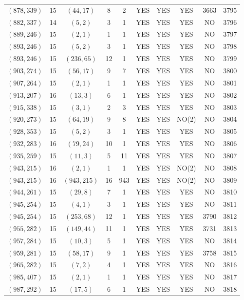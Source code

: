 \begin{longtable}{|c|c|c|c|c|c|c|c|c|c|}
$(878, 339)$ & 15 & $(44, 17)$ & 8 & 2 & YES & YES & YES & 3663 & 3795\\
$(882, 337)$ & 14 & $(5, 2)$ & 3 & 1 & YES & YES & YES & NO & 3796\\
$(889, 246)$ & 15 & $(2, 1)$ & 1 & 1 & YES & YES & YES & NO & 3797\\
$(893, 246)$ & 15 & $(5, 2)$ & 3 & 1 & YES & YES & YES & NO & 3798\\
$(893, 246)$ & 15 & $(236, 65)$ & 12 & 1 & YES & YES & YES & NO & 3799\\
$(903, 274)$ & 15 & $(56, 17)$ & 9 & 7 & YES & YES & YES & NO & 3800\\
$(907, 264)$ & 15 & $(2, 1)$ & 1 & 1 & YES & YES & YES & NO & 3801\\
$(913, 207)$ & 16 & $(13, 3)$ & 6 & 1 & YES & YES & YES & NO & 3802\\
$(915, 338)$ & 15 & $(3, 1)$ & 2 & 3 & YES & YES & YES & NO & 3803\\
$(920, 273)$ & 15 & $(64, 19)$ & 9 & 8 & YES & YES & NO(2) & NO & 3804\\
$(928, 353)$ & 15 & $(5, 2)$ & 3 & 1 & YES & YES & YES & NO & 3805\\
$(932, 283)$ & 16 & $(79, 24)$ & 10 & 1 & YES & YES & YES & NO & 3806\\
$(935, 259)$ & 15 & $(11, 3)$ & 5 & 11 & YES & YES & YES & NO & 3807\\
$(943, 215)$ & 16 & $(2, 1)$ & 1 & 1 & YES & YES & NO(2) & NO & 3808\\
$(943, 215)$ & 16 & $(943, 215)$ & 16 & 943 & YES & YES & NO(2) & NO & 3809\\
$(944, 261)$ & 15 & $(29, 8)$ & 7 & 1 & YES & YES & YES & NO & 3810\\
$(945, 254)$ & 15 & $(4, 1)$ & 3 & 1 & YES & YES & YES & NO & 3811\\
$(945, 254)$ & 15 & $(253, 68)$ & 12 & 1 & YES & YES & YES & 3790 & 3812\\
$(955, 282)$ & 15 & $(149, 44)$ & 11 & 1 & YES & YES & YES & 3731 & 3813\\
$(957, 284)$ & 15 & $(10, 3)$ & 5 & 1 & YES & YES & YES & NO & 3814\\
$(959, 281)$ & 15 & $(58, 17)$ & 9 & 1 & YES & YES & YES & 3758 & 3815\\
$(965, 282)$ & 15 & $(7, 2)$ & 4 & 1 & YES & YES & YES & NO & 3816\\
$(985, 407)$ & 15 & $(2, 1)$ & 1 & 1 & YES & YES & YES & NO & 3817\\
$(987, 292)$ & 15 & $(17, 5)$ & 6 & 1 & YES & YES & YES & NO & 3818\\

\end{longtable}
